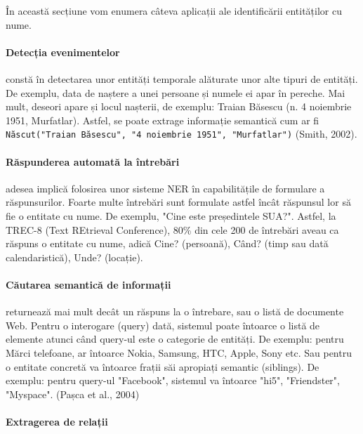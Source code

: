 În această secțiune vom enumera câteva aplicații ale identificării entităților cu nume.

\paragraph{Detecția evenimentelor}

constă în detectarea unor entități temporale alăturate unor alte tipuri de entități. De exemplu, data de naștere a unei persoane și numele ei apar în pereche. Mai mult, deseori apare și locul nașterii, de exemplu: Traian Băsescu (n. 4 noiembrie 1951, Murfatlar). Astfel, se poate extrage informație semantică cum ar fi \texttt{Născut("Traian Băsescu", "4 noiembrie 1951", "Murfatlar")} (Smith, 2002).\cite{Smith02detectingand}

\paragraph{Răspunderea automată la întrebări}

adesea implică folosirea unor sisteme NER în capabilitățile de formulare a răspunsurilor. Foarte multe întrebări sunt formulate astfel încât răspunsul lor să fie o entitate cu nume. De exemplu, "Cine este președintele SUA?". Astfel, la TREC-8 (Text REtrieval Conference), 80\% din cele 200 de întrebări aveau ca răspuns o entitate cu nume, adică Cine? (persoană), Când? (timp sau dată calendaristică), Unde? (locație).\cite{trec8}

\paragraph{Căutarea semantică de informații}

returnează mai mult decât un răspuns la o întrebare, sau o listă de documente Web. Pentru o interogare (query) dată, sistemul poate întoarce o listă de elemente atunci când query-ul este o categorie de entități. De exemplu: pentru Mărci telefoane, ar întoarce Nokia, Samsung, HTC, Apple, Sony etc. Sau pentru o entitate concretă va întoarce frații săi apropiați semantic (siblings). De exemplu: pentru query-ul "Facebook", sistemul va întoarce "hi5", "Friendster", "Myspace". (Pașca et al., 2004)\cite{pasca2004}

\paragraph{Extragerea de relații}
\label{paragraph:relation}

